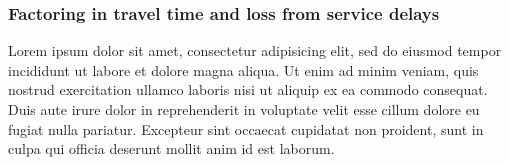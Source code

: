 \documentclass{article} %
\begin{document}
\subsubsection*{Factoring in travel time and loss from service delays}

Lorem ipsum dolor sit amet, consectetur adipisicing elit, sed do eiusmod tempor incididunt ut labore et dolore magna aliqua. Ut enim ad minim veniam, quis nostrud exercitation ullamco laboris nisi ut aliquip ex ea commodo consequat. Duis aute irure dolor in reprehenderit in voluptate velit esse cillum dolore eu fugiat nulla pariatur. Excepteur sint occaecat cupidatat non proident, sunt in culpa qui officia deserunt mollit anim id est laborum.


\end{document}
